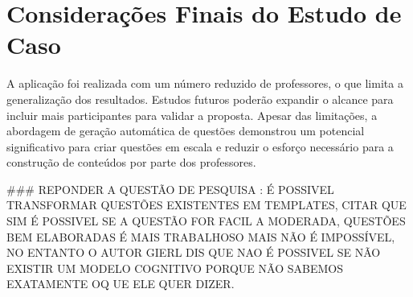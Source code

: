 \section{Considerações Finais do Estudo de Caso}
A aplicação foi realizada com um número reduzido de professores, o que limita a generalização dos resultados. Estudos futuros poderão expandir o alcance para incluir mais participantes para validar a proposta. Apesar das limitações, a abordagem de geração automática de questões demonstrou um potencial significativo para criar questões em escala e reduzir o esforço necessário para a construção de conteúdos por parte dos professores.


### REPONDER A QUESTÃO DE PESQUISA : É POSSIVEL TRANSFORMAR QUESTÕES EXISTENTES EM TEMPLATES, CITAR QUE SIM É POSSIVEL SE A QUESTÃO FOR FACIL A MODERADA, QUESTÕES BEM ELABORADAS É MAIS TRABALHOSO MAIS NÃO É IMPOSSÍVEL, NO ENTANTO O AUTOR GIERL DIS QUE NAO É POSSIVEL SE NÃO EXISTIR UM MODELO COGNITIVO PORQUE NÃO SABEMOS EXATAMENTE OQ UE ELE QUER DIZER. 